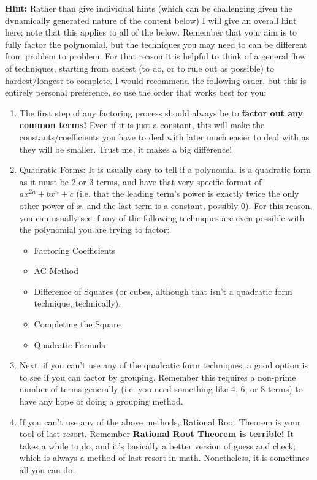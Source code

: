 \documentclass{ximera}
\begin{document}
\textbf{Hint:} Rather than give individual hints (which can be challenging given the dynamically generated nature of the content below) I will give an overall hint here; note that this applies to all of the below. Remember that your aim is to fully factor the polynomial, but the techniques you may need to can be different from problem to problem. For that reason it is helpful to think of a general flow of techniques, starting from easiest (to do, or to rule out as possible) to hardest/longest to complete. I would recommend the following order, but this is entirely personal preference, so use the order that works best for you:
\begin{enumerate}
    \item The first step of any factoring process should always be to \textbf{factor out any common terms!} Even if it is just a constant, this will make the constants/coefficients you have to deal with later much easier to deal with as they will be smaller. Trust me, it makes a big difference!
    \item Quadratic Forms: It is usually easy to tell if a polynomial is a quadratic form as it must be 2 or 3 terms, and have that very specific format of $ax^{2n} + bx^n + c$ (i.e. that the leading term's power is exactly twice the only other power of $x$, and the last term is a constant, possibly $0$). For this reason, you can usually see if any of the following techniques are even possible with the polynomial you are trying to factor:
    \begin{itemize}
        \item Factoring Coefficients
        \item AC-Method
        \item Difference of Squares (or cubes, although that isn't a quadratic form technique, technically).
        \item Completing the Square
        \item Quadratic Formula
    \end{itemize}
    \item Next, if you can't use any of the quadratic form techniques, a good option is to see if you can factor by grouping. Remember this requires a non-prime number of terms generally (i.e. you need something like 4, 6, or 8 terms) to have any hope of doing a grouping method.
    \item If you can't use any of the above methods, Rational Root Theorem is your tool of last resort. Remember \textbf{Rational Root Theorem is terrible!} It takes a while to do, and it's basically a better version of guess and check; which is always a method of last resort in math. Nonetheless, it is sometimes all you can do.
\end{enumerate}
\end{document}
